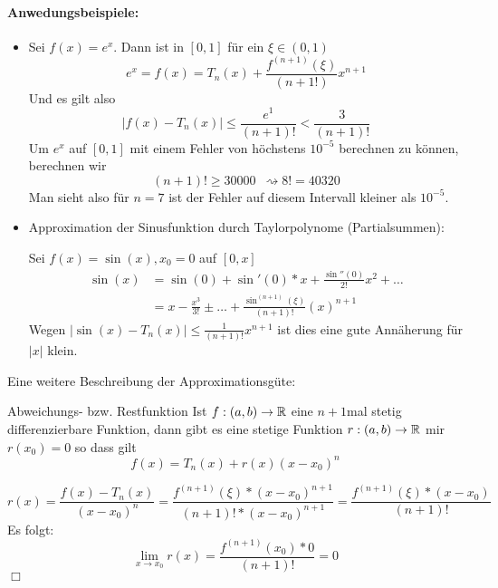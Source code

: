 \paragraph{Anwedungsbeispiele:}
\begin{itemize}
	\item Sei $f(x)=e^x$. Dann ist in $[0,1]$ für ein $\xi\in(0,1)$
	\begin{equation*}
		e^x=f(x)=T_n(x)+\frac{f^{(n+1)}(\xi)}{(n+1!)}x^{n+1}
	\end{equation*}
	Und es gilt also
	\begin{equation*}
		|f(x)-T_n(x)|\leq \frac{e^1}{(n+1)!}<\frac{3}{(n+1)!}
	\end{equation*}
	Um $e^x$ auf $[0,1]$ mit einem Fehler von höchstens $10^{-5}$ berechnen zu können, berechnen wir
	\begin{equation*}
		(n+1)!\geq 30000 \enspace\rightsquigarrow8!=40320
	\end{equation*}
	Man sieht also für $n=7$ ist der Fehler auf diesem Intervall kleiner als $10^{-5}$.
	\item Approximation der Sinusfunktion durch Taylorpolynome (Partialsummen):

	Sei $f(x)=\sin(x), x_0=0$ auf $[0,x]$
	\begin{align*}
		\sin(x)&=\sin(0)+\sin'(0)*x+\frac{\sin''(0)}{2!}x^2+\ldots\\
		&=x-\frac{x^3}{3!}\pm\ldots +\frac{\sin^{(n+1)}(\xi)}{(n+1)!}(x)^{n+1}
	\end{align*}
	Wegen $|\sin(x)-T_n(x)|\leq \frac{1}{(n+1)!}x^{n+1}$ ist dies eine gute Annäherung für $|x|$ klein.
\end{itemize}

Eine weitere Beschreibung der Approximationsgüte:
\begin{lemma}{Abweichungs- bzw. Restfunktion}
	Ist $f:(a,b)\rightarrow \mathbb{R}$ eine $n+1$mal stetig differenzierbare Funktion, dann gibt es eine stetige Funktion $r:(a,b)\rightarrow \mathbb{R}$ mir $r(x_0)=0$ so dass gilt
	\begin{equation*}
		f(x)=T_n(x)+r(x)(x-x_0)^n
	\end{equation*}
\end{lemma}
\begin{beweis}
	\begin{equation*}
		r(x)=\frac{f(x)-T_n(x)}{(x-x_0)^n}=\frac{f^{(n+1)}(\xi)*(x-x_0)^{n+1}}{(n+1)!*(x-x_0)^{n+1}}=\frac{f^{(n+1)}(\xi)*(x-x_0)}{(n+1)!}
	\end{equation*}
	Es folgt:
	\begin{equation*}
		\lim\limits_{x\to x_0}r(x)=\frac{f^{(n+1)}(x_0)*0}{(n+1)!}=0
	\end{equation*}
	\hfill$\Box$
\end{beweis}

